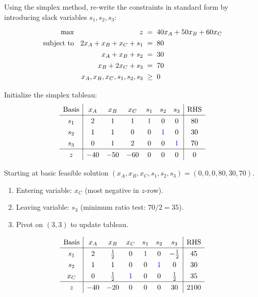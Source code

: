 \documentclass[a4paper, 10pt]{article}
\begin{document}
\begin{solution}
Using the simplex method, re-write the constraints in standard form by introducing slack variables \( s_1, s_2, s_3 \):
\[
\begin{array}{@{\hspace{2mm}} r @{\hspace{2mm}} r @{\hspace{2mm}} c @{\hspace{2mm}} l}
    \text{max } & z & = & 40x_A + 50x_B + 60x_C \\
    \text{subject to } & 2x_A + x_B + x_C + s_1 & = & 80 \\
    & x_A + x_B + s_2 & = & 30 \\
    & x_B + 2x_C + s_3 & = & 70 \\
    & x_A, x_B, x_C, s_1, s_2, s_3 & \geq & 0
\end{array}
\]

Initialize the simplex tableau:
\[
\begin{array}{c|cccccc|c}
\text{Basis} & x_A & x_B & x_C & s_1 & s_2 & s_3 & \text{RHS} \\
\hline
s_1 & 2 & 1 & 1 & \textcolor[HTML]{0000FF}{1} & 0 & 0 & 80 \\
s_2 & 1 & 1 & 0 & 0 & \textcolor[HTML]{0000FF}{1} & 0 & 30 \\
s_3 & 0 & 1 & 2 & 0 & 0 & \textcolor[HTML]{0000FF}{1} & 70 \\
\hline
z & -40 & -50 & -60 & 0 & 0 & 0 & 0 \\
\end{array}
\]

\newpage

Starting at basic feasible solution \( (x_A, x_B, x_C, s_1, s_2, s_3) = (0, 0, 0, 80, 30, 70) \).
\begin{enumerate}
    \item Entering variable: \( x_C \) (most negative in \( z \)-row).
    \item Leaving variable: \( s_3 \) (minimum ratio test: \( 70/2 = 35 \)).
    \item Pivot on \( (3,3) \) to update tableau.
\end{enumerate}
\[
\renewcommand{\arraystretch}{1.3}
\begin{array}{c|cccccc|c}
\text{Basis} & x_A & x_B & x_C & s_1 & s_2 & s_3 & \text{RHS} \\
\hline
s_1 & 2 & \frac{1}{2} & 0 & \textcolor[HTML]{0000FF}{1} & 0 & -\frac{1}{2} & 45 \\
s_2 & 1 & 1 & 0 & 0 & \textcolor[HTML]{0000FF}{1} & 0 & 30 \\
x_C & 0 & \frac{1}{2} & \textcolor[HTML]{0000FF}{1} & 0 & 0 & \frac{1}{2} & 35 \\
\hline
z & -40 & -20 & 0 & 0 & 0 & 30 & 2100 \\
\end{array}
\]


\end{solution}
\end{document}
